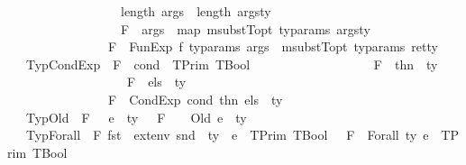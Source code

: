 \begin{isabellebody}
\ \ \ \ \ \ \ \ \ \ \ \ \ \ \ \ \ \ length\ args\ {\isacharequal}{\kern0pt}\ length\ args{\isacharunderscore}{\kern0pt}ty{\isacharsemicolon}{\kern0pt}\isanewline
\ \ \ \ \ \ \ \ \ \ \ \ \ \ \ \ \ \ F{\isacharcomma}{\kern0pt}{\isasymDelta}\ {\isasymturnstile}\ args\ {\isacharbrackleft}{\kern0pt}{\isacharcolon}{\kern0pt}{\isacharbrackright}{\kern0pt}\ {\isacharparenleft}{\kern0pt}map\ {\isacharparenleft}{\kern0pt}msubstT{\isacharunderscore}{\kern0pt}opt\ ty{\isacharunderscore}{\kern0pt}params{\isacharparenright}{\kern0pt}\ args{\isacharunderscore}{\kern0pt}ty{\isacharparenright}{\kern0pt}\ {\isasymrbrakk}\ {\isasymLongrightarrow}\ \isanewline
\ \ \ \ \ \ \ \ \ \ \ \ \ \ \ \ F{\isacharcomma}{\kern0pt}{\isasymDelta}\ {\isasymturnstile}\ FunExp\ f\ ty{\isacharunderscore}{\kern0pt}params\ args\ {\isacharcolon}{\kern0pt}\ {\isacharparenleft}{\kern0pt}msubstT{\isacharunderscore}{\kern0pt}opt\ ty{\isacharunderscore}{\kern0pt}params\ ret{\isacharunderscore}{\kern0pt}ty{\isacharparenright}{\kern0pt}{\isachardoublequoteclose}\isanewline
\ \ {\isacharbar}{\kern0pt}\ TypCondExp{\isacharcolon}{\kern0pt}\ {\isachardoublequoteopen}{\isasymlbrakk}\ F{\isacharcomma}{\kern0pt}{\isasymDelta}\ {\isasymturnstile}\ cond\ {\isacharcolon}{\kern0pt}\ TPrim\ {\isacharparenleft}{\kern0pt}TBool{\isacharparenright}{\kern0pt}{\isacharsemicolon}{\kern0pt}\isanewline
\ \ \ \ \ \ \ \ \ \ \ \ \ \ \ \ \ \ \ F{\isacharcomma}{\kern0pt}{\isasymDelta}\ {\isasymturnstile}\ thn\ {\isacharcolon}{\kern0pt}\ ty{\isacharsemicolon}{\kern0pt}\isanewline
\ \ \ \ \ \ \ \ \ \ \ \ \ \ \ \ \ \ \ F{\isacharcomma}{\kern0pt}{\isasymDelta}\ {\isasymturnstile}\ els\ {\isacharcolon}{\kern0pt}\ ty\ {\isasymrbrakk}\ {\isasymLongrightarrow}\isanewline
\ \ \ \ \ \ \ \ \ \ \ \ \ \ \ \ F{\isacharcomma}{\kern0pt}{\isasymDelta}\ {\isasymturnstile}\ CondExp\ cond\ thn\ els\ {\isacharcolon}{\kern0pt}\ ty{\isachardoublequoteclose}\isanewline
\ \ {\isacharbar}{\kern0pt}\ TypOld{\isacharcolon}{\kern0pt}\ {\isachardoublequoteopen}{\isasymlbrakk}\ F{\isacharcomma}{\kern0pt}\ {\isasymDelta}\ {\isasymturnstile}\ e\ {\isacharcolon}{\kern0pt}\ ty\ {\isasymrbrakk}\ {\isasymLongrightarrow}\ F{\isacharcomma}{\kern0pt}\ {\isasymDelta}\ \ {\isasymturnstile}\ Old\ e\ {\isacharcolon}{\kern0pt}\ ty{\isachardoublequoteclose}\isanewline
\ \ {\isacharbar}{\kern0pt}\ TypForall{\isacharcolon}{\kern0pt}\ {\isachardoublequoteopen}{\isasymlbrakk}\ F{\isacharcomma}{\kern0pt}\ {\isacharparenleft}{\kern0pt}fst\ {\isasymDelta}{\isacharcomma}{\kern0pt}\ ext{\isacharunderscore}{\kern0pt}env\ {\isacharparenleft}{\kern0pt}snd\ {\isasymDelta}{\isacharparenright}{\kern0pt}\ ty{\isacharparenright}{\kern0pt}\ {\isasymturnstile}\ e\ {\isacharcolon}{\kern0pt}\ TPrim\ {\isacharparenleft}{\kern0pt}TBool{\isacharparenright}{\kern0pt}\ {\isasymrbrakk}\ {\isasymLongrightarrow}\ F{\isacharcomma}{\kern0pt}{\isasymDelta}\ {\isasymturnstile}\ Forall\ ty\ e\ {\isacharcolon}{\kern0pt}\ TPrim\ {\isacharparenleft}{\kern0pt}TBool{\isacharparenright}{\kern0pt}{\isachardoublequoteclose}\isanewline

\end{isabellebody}
